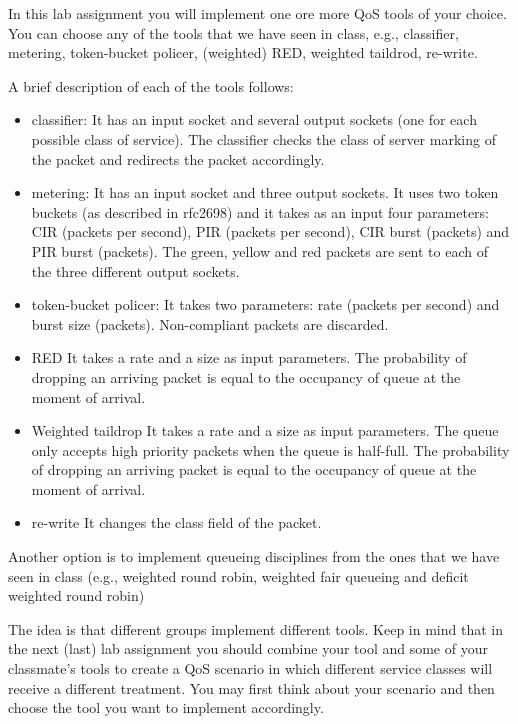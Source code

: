 In this lab assignment you will implement one ore more QoS tools of your choice.
You can choose any of the tools that we have seen in class, e.g.,  classifier, metering, token-bucket policer, (weighted) RED, weighted taildrod, re-write.

A brief description of each of the tools follows:
\begin{itemize}
  \item{classifier:}
  It has an input socket and several output sockets (one for each possible class of service).
  The classifier checks the class of server marking of the packet and redirects the packet accordingly.
  \item{metering:}
  It has an input socket and three output sockets.
  It uses two token buckets (as described in rfc2698) and it takes as an input four parameters: CIR (packets per second), PIR (packets per second), CIR burst (packets) and PIR burst (packets).
  The green, yellow and red packets are sent to each of the three different output sockets.
  \item{token-bucket policer:}
  It takes two parameters: rate (packets per second) and burst size (packets).
  Non-compliant packets are discarded.
  \item{ RED}
  It takes a rate and a size as input parameters.
   The probability of dropping an arriving packet is equal to the occupancy of queue at the moment of arrival.
  \item{Weighted taildrop }
  It takes a rate and a size as input parameters.
  The queue only accepts high priority packets when the queue is half-full.
   The probability of dropping an arriving packet is equal to the occupancy of queue at the moment of arrival.
  \item{re-write}
  It changes the class field of the packet.
\end{itemize}

Another option is to implement queueing disciplines from the ones that we have seen in class (e.g., weighted round robin, weighted fair queueing and deficit weighted round robin)

The idea is that different groups implement different tools.
Keep in mind that in the next (last) lab assignment you should combine your tool and some of your classmate's tools to create a QoS scenario in which different service classes will receive a different treatment.
You may first think about your scenario and then choose the tool you want to implement accordingly.


